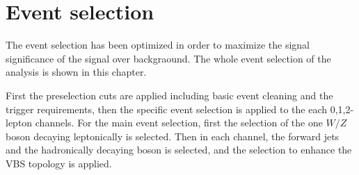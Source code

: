 \chapter{Event selection}
The event selection has been optimized in order to maximize the signal significance of the signal over backgraound.
The whole event selection of the analysis is shown in this chapter.

First the preselection cuts are applied including basic event cleaning and the trigger requirements, then the specific event selection is applied to the each 0,1,2-lepton channels.
For the main event selection, first the selection of the one $W/Z$ boson decaying leptonically is selected. Then in each channel, the forward jets and the hadronically decaying boson is selected, and the selection to enhance the VBS topology is applied.


